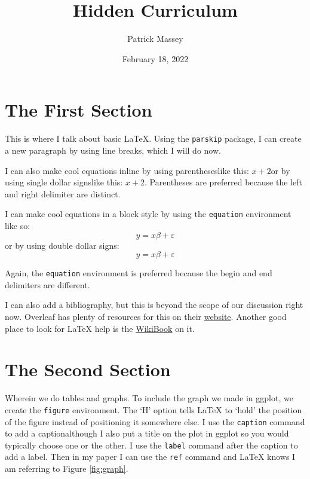 \documentclass{article}
\author{Patrick Massey}
\title{Hidden Curriculum}
\date{February 18, 2022}
\begin{document}
\maketitle

\section{The First Section}

This is where I talk about basic \LaTeX. Using the \texttt{parskip} package, I can create a new paragraph by using line breaks, which I will do now.

I can also make cool equations inline by using parentheses{\textemdash}like this: \(x + 2\){\textemdash}or by using single dollar signs{\textemdash}like this: $x+2$. Parentheses are preferred because the left and right delimiter are distinct.

I can make cool equations in a block style by using the \texttt{equation} environment like so:
\begin{equation*}
    y = x\beta + \varepsilon
\end{equation*}
or by using double dollar signs:
$$
    y = x\beta + \varepsilon
$$

Again, the \texttt{equation} environment is preferred because the begin and end delimiters are different.

I can also add a bibliography, but this is beyond the scope of our discussion right now. Overleaf has plenty of resources for this on their \href{https://www.overleaf.com/learn}{website}. Another good place to look for LaTeX help is the \href{https://en.wikibooks.org/wiki/LaTeX}{WikiBook} on it.

\newpage

\section{The Second Section}

Wherein we do tables and graphs. To include the graph we made in ggplot, we create the \texttt{figure} environment. The `H' option tells LaTeX to `hold' the position of the figure instead of positioning it somewhere else. I use the \texttt{caption} command to add a caption{\textemdash}although I also put a title on the plot in ggplot so you would typically choose one or the other. I use the \texttt{label} command after the caption to add a label. Then in my paper I can use the \texttt{ref} command and LaTeX knows I am referring to Figure \ref{fig:graph}.
\end{document}

